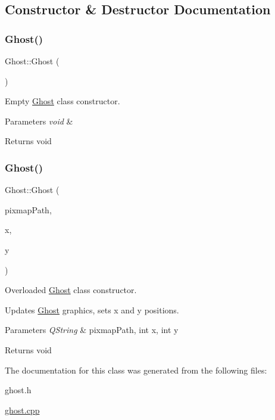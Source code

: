 \subsection{Constructor \& Destructor Documentation}
\mbox{\label{class_ghost_a2e38d3c0c8546cceb74777b49a8e3bb7}} 
\subsubsection{\texorpdfstring{Ghost()}{Ghost()}\hspace{0.1cm}{\footnotesize\ttfamily [1/2]}}
{\footnotesize\ttfamily Ghost\+::\+Ghost (\begin{DoxyParamCaption}{ }\end{DoxyParamCaption})}



Empty \mbox{\hyperlink{class_ghost}{Ghost}} class constructor. 


\begin{DoxyParams}{Parameters}
{\em void} & \\
\hline
\end{DoxyParams}
\begin{DoxyReturn}{Returns}
void 
\end{DoxyReturn}
\mbox{\label{class_ghost_a3b8caf4d2c5a166c05f29e8478abdb4c}} 
\subsubsection{\texorpdfstring{Ghost()}{Ghost()}\hspace{0.1cm}{\footnotesize\ttfamily [2/2]}}
{\footnotesize\ttfamily Ghost\+::\+Ghost (\begin{DoxyParamCaption}\item[{Q\+String}]{pixmap\+Path,  }\item[{int}]{x,  }\item[{int}]{y }\end{DoxyParamCaption})}



Overloaded \mbox{\hyperlink{class_ghost}{Ghost}} class constructor. 

Updates \mbox{\hyperlink{class_ghost}{Ghost}} graphics, sets x and y positions. 
\begin{DoxyParams}{Parameters}
{\em Q\+String} & pixmap\+Path, int x, int y \\
\hline
\end{DoxyParams}
\begin{DoxyReturn}{Returns}
void 
\end{DoxyReturn}


The documentation for this class was generated from the following files\+:\begin{DoxyCompactItemize}
\item 
ghost.\+h\item 
\mbox{\hyperlink{ghost_8cpp}{ghost.\+cpp}}\end{DoxyCompactItemize}
